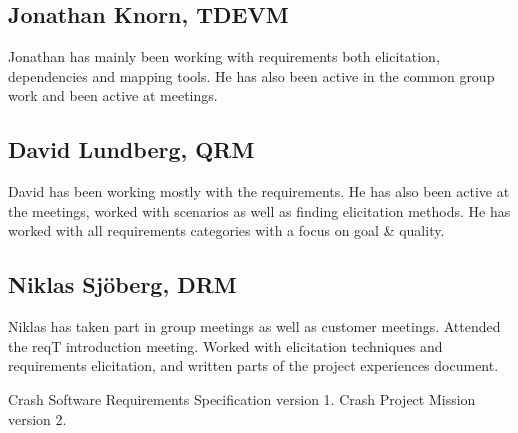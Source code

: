 \documentclass[10pt]{article}
\begin{document}
\subsection{Jonathan Knorn, TDEVM}
Jonathan has mainly been working with requirements both elicitation, dependencies and mapping tools. 
He has also been active in the common group work and been active at meetings.
\subsection{David Lundberg, QRM}
David has been working mostly with the requirements. He has also been active at the meetings, worked with scenarios as well as finding elicitation methods. He has worked with all requirements categories with a focus on goal & quality. 
\subsection{Niklas Sjöberg, DRM}
Niklas has taken part in group meetings as well as customer meetings. Attended the reqT introduction meeting. Worked with elicitation techniques and requirements elicitation, and written parts of the project experiences document. 

\begin{thebibliography}{1}
 Crash Software Requirements Specification version 1. 
 Crash Project Mission version 2.
\end{thebibliography}
\end{document}
